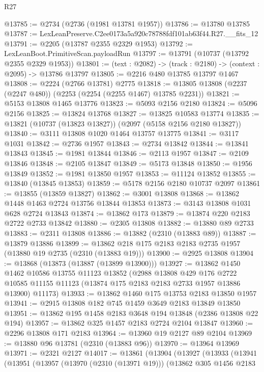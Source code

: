 \begin{lexlean}{R27}
\begin{coremodule}
@13785 := @2734 (@2736 (@1981 @13781 @1957))
@13786 := @13780 @13785
@13787 := LexLeanPreserve.C2ee0173a5a920c78788fdf101ab63f44.R27.__fits_12
@13791 := @2205 (@13787 @2355 @2329 @1953)
@13792 := LexLeanBoot.PrimitiveScan.payloadRun
@13797 := @13791 (@10737 (@13792 @2355 @2329 @1953))
@13801 := (text : @2082) -> (track : @2180) -> (context : @2095) -> @13786 @13797
@13805 := @2216 @480 @13785 @13797 @1467
@13808 := @2224 (@2766 @13781) @2775
@13818 := @13805 @13808 (@2237 (@2247 @480)) (@2253 (@2254 (@2255 @1467) @13785 @2231))
@13821 := @5153 @13808 @1465 @13776
@13823 := @5093 @2156 @2180
@13824 := @5096 @2156
@13825 := @13824 @13768
@13827 := @13825 @10583 @13774
@13835 := @13821 (@10737 (@13823 @13827)) (@2097 (@5158 @2156 @2180 @13827))
@13840 := @3111 @13808 @1020 @1464 @13757 @13775
@13841 := @3117 @1031
@13842 := @2736 @1957
@13843 := @2734 @13842
@13844 := @13841 @13843
@13845 := @1981 @13844
@13846 := @2113 @1957
@13847 := @2109 @13846
@13848 := @2105 @13847
@13849 := @5173 @13848
@13850 := @1956 @13849
@13852 := @1981 @13850 @1957
@13853 := @11124 @13852
@13855 := @13840 (@13845 @13853)
@13859 := @5178 @2156 @2180 @10737 @2097
@13861 := @13855 (@13859 @13827)
@13862 := @3001 @13808
@13868 := @13862 @1448 @1463 @2724 @13756 @13844 @13853
@13873 := @3143 @13808 @1031 @628 @2724 @13843
@13874 := @13862 @173
@13879 := @13874 @220 @2183 @2722 @2733 @13842
@13880 := @2305 @13808
@13882 := @13880 @89 @2733
@13883 := @2311 @13808
@13886 := @13882 (@2310 (@13883 @89))
@13887 := @13879 @13886
@13899 := @13862 @218 @175 @2183 @2183 @2735 @1957 (@13880 @19 @2735 (@2310 (@13883 @19)))
@13900 := @2925 @13808
@13904 := @13868 (@13873 (@13887 (@13899 @13900)))
@13927 := @13862
    @1450
    @1462
    @10586
    @13755
    @11123
    @13852
    (@2988
      @13808
      @429
      @176
      @2722
      @10585
      @11155
      @11123
      (@13874 @175 @2183 @2183 @2733 @1957 @13886 @13900)
      @11173)
@13933 := @13862 @1460 @175 @13753 @2183 @13850 @1957
@13941 := @2915 @13808 @182 @745 @1459 @3649 @2183 @13849 @13850
@13951 := @13862 @195 @1458 @2183 @3648 @194 @13848 (@2386 @13808 @22 @194)
@13957 := @13862 @325 @1457 @2183 @2724 @2104 @13847
@13960 := @2296 @13808 @171 @2183
@13964 := @13960 @19 @2127 @89 @2104
@13969 := @13880 @96 @13781 (@2310 (@13883 @96))
@13970 := @13964 @13969
@13971 := @2321 @2127
@14017 := @13861
    (@13904
      (@13927
        (@13933
          (@13941
            (@13951
              (@13957
                (@13970 (@2310 (@13971 @19)))
                (@13862
                  @305
                  @1456
                  @2183

\end{coremodule}
\end{lexlean}
